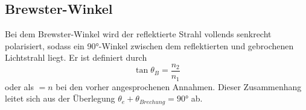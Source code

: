 \subsection{Brewster-Winkel}
\label{subsec:brewster}
Bei dem Brewster-Winkel wird der reflektierte Strahl vollends senkrecht polarisiert, 
sodass ein 90°-Winkel zwischen dem reflektierten und gebrochenen Lichtstrahl
liegt. Er ist definiert durch
\begin{equation}
    \tan{\theta_B} = \frac{n_2}{n_1}
\end{equation}
oder als $=n$ bei den vorher angesprochenen Annahmen. Dieser Zusammenhang leitet 
sich aus der Überlegung $\theta_e + \theta_{Brechung} = 90°$ ab.